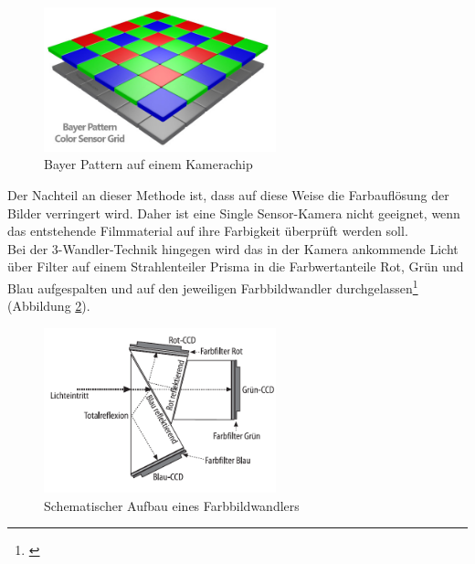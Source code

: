 \begin{figure}[htp]     %
\centering
\includegraphics[width=0.6\textwidth]{bilder/bayer} 
\caption {Bayer Pattern auf einem Kamerachip\protect\footnotemark}\label{b_bayer}
\end{figure}

Der Nachteil an dieser Methode ist, dass auf diese Weise die Farbauflösung der Bilder verringert wird. Daher ist eine \glqq Single Sensor\grqq -Kamera nicht geeignet, wenn das entstehende Filmmaterial auf ihre Farbigkeit überprüft werden soll.\\
Bei der 3-Wandler-Technik hingegen wird das in der Kamera ankommende Licht über Filter auf einem Strahlenteiler Prisma in die Farbwertanteile Rot, Grün und Blau aufgespalten und auf den jeweiligen Farbbildwandler durchgelassen\footnote{\cite[378]{schmidt}} (Abbildung \ref{b_wandler}). 

\begin{figure}[H]     %
\centering
\includegraphics[width=0.6\textwidth]{bilder/wandler} 
\caption {Schematischer Aufbau eines Farbbildwandlers\protect\footnotemark}\label{b_wandler}
\end{figure}


